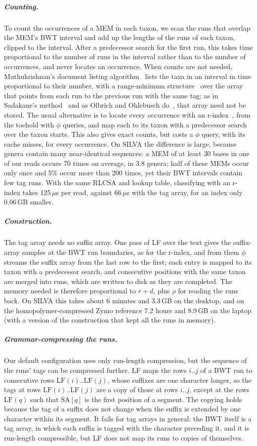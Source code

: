 \subparagraph*{Counting.}
To count the occurrences of a MEM in each taxon, we scan the runs that overlap the MEM's BWT interval and add up the lengths of the runs of each taxon, clipped to the interval.
After a predecessor search for the first run, this takes time proportional to the number of runs in the interval rather than to the number of occurrences, and never locates an occurrence.
When counts are not needed, Muthukrishnan's document listing algorithm~\cite{Mut02} lists the taxa in an interval in time proportional to their number, with a range-minimum structure~\cite{FH11} over the array that points from each run to the previous run with the same tag; as in Sadakane's method~\cite{Sad07} and as Olbrich and Ohlebusch do~\cite{OO26}, that array need not be stored.
The usual alternative is to locate every occurrence with an r-index~\cite{GagieNavarroPrezza2020}, from the toehold with $\phi$ queries, and map each to its taxon with a predecessor search over the taxon starts.
This also gives exact counts, but costs a $\phi$ query, with its cache misses, for every occurrence.
On SILVA the difference is large, because genera contain many near-identical sequences: a MEM of at least 30 bases in one of our reads occurs 70 times on average, in 3.8 genera; half of these MEMs occur only once and 5\% occur more than 200 times, yet their BWT intervals contain few tag runs.
With the same RLCSA and lookup table, classifying with an r-index takes 125\,$\mu$s per read, against 66\,$\mu$s with the tag array, for an index only 0.06\,GB smaller.

\subparagraph*{Construction.}
The tag array needs no suffix array.
One pass of LF over the text gives the suffix-array samples at the BWT run boundaries, as for the r-index, and from them $\phi$ streams the suffix array from the last row to the first; each entry is mapped to its taxon with a predecessor search, and consecutive positions with the same taxon are merged into runs, which are written to disk as they are completed.
The memory needed is therefore proportional to $r + d$, plus $\rho$ for reading the runs back.
On SILVA this takes about 6 minutes and 3.3\,GB on the desktop, and on the homopolymer-compressed Zymo reference 7.2 hours and 8.9\,GB on the laptop (with a version of the construction that kept all the runs in memory).

\subparagraph*{Grammar-compressing the runs.}
\label{sec:grammar}
Our default configuration uses only run-length compression, but the sequence of the runs' tags can be compressed further.
LF maps the rows $i..j$ of a BWT run to consecutive rows $\mathrm{LF}(i)..\mathrm{LF}(j)$, whose suffixes are one character longer, so the tags at rows $\mathrm{LF}(i)..\mathrm{LF}(j)$ are a copy of those at rows $i..j$, except at the rows $\mathrm{LF}(q)$ such that $\mathrm{SA}[q]$ is the first position of a segment.
The copying holds because the tag of a suffix does not change when the suffix is extended by one character within its segment.
It fails for tag arrays in general: the BWT itself is a tag array, in which each suffix is tagged with the character preceding it, and it is run-length compressible, but LF does not map its runs to copies of themselves.

